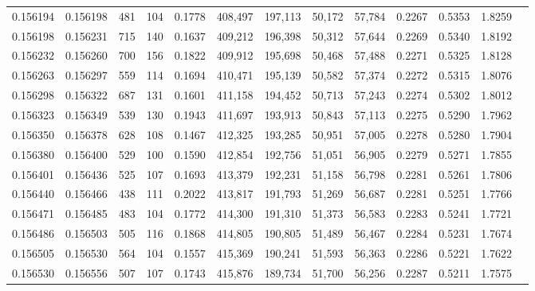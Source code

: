 \begin{tabular}{rrrrrrrrrrrrr}
0.156194 & 0.156198 &   481 & 104 &                                     0.1778 & 408,497 & 197,113 &  50,172 &  57,784 & 0.2267 & 0.5353 & 1.8259 \\
0.156198 & 0.156231 &   715 & 140 &                                     0.1637 & 409,212 & 196,398 &  50,312 &  57,644 & 0.2269 & 0.5340 & 1.8192 \\
0.156232 & 0.156260 &   700 & 156 &                                     0.1822 & 409,912 & 195,698 &  50,468 &  57,488 & 0.2271 & 0.5325 & 1.8128 \\
0.156263 & 0.156297 &   559 & 114 &                                     0.1694 & 410,471 & 195,139 &  50,582 &  57,374 & 0.2272 & 0.5315 & 1.8076 \\
0.156298 & 0.156322 &   687 & 131 &                                     0.1601 & 411,158 & 194,452 &  50,713 &  57,243 & 0.2274 & 0.5302 & 1.8012 \\
0.156323 & 0.156349 &   539 & 130 &                                     0.1943 & 411,697 & 193,913 &  50,843 &  57,113 & 0.2275 & 0.5290 & 1.7962 \\
0.156350 & 0.156378 &   628 & 108 &                                     0.1467 & 412,325 & 193,285 &  50,951 &  57,005 & 0.2278 & 0.5280 & 1.7904 \\
0.156380 & 0.156400 &   529 & 100 &                                     0.1590 & 412,854 & 192,756 &  51,051 &  56,905 & 0.2279 & 0.5271 & 1.7855 \\
0.156401 & 0.156436 &   525 & 107 &                                     0.1693 & 413,379 & 192,231 &  51,158 &  56,798 & 0.2281 & 0.5261 & 1.7806 \\
0.156440 & 0.156466 &   438 & 111 &                                     0.2022 & 413,817 & 191,793 &  51,269 &  56,687 & 0.2281 & 0.5251 & 1.7766 \\
0.156471 & 0.156485 &   483 & 104 &                                     0.1772 & 414,300 & 191,310 &  51,373 &  56,583 & 0.2283 & 0.5241 & 1.7721 \\
0.156486 & 0.156503 &   505 & 116 &                                     0.1868 & 414,805 & 190,805 &  51,489 &  56,467 & 0.2284 & 0.5231 & 1.7674 \\
0.156505 & 0.156530 &   564 & 104 &                                     0.1557 & 415,369 & 190,241 &  51,593 &  56,363 & 0.2286 & 0.5221 & 1.7622 \\
0.156530 & 0.156556 &   507 & 107 &                                     0.1743 & 415,876 & 189,734 &  51,700 &  56,256 & 0.2287 & 0.5211 & 1.7575 \\

\end{tabular}
